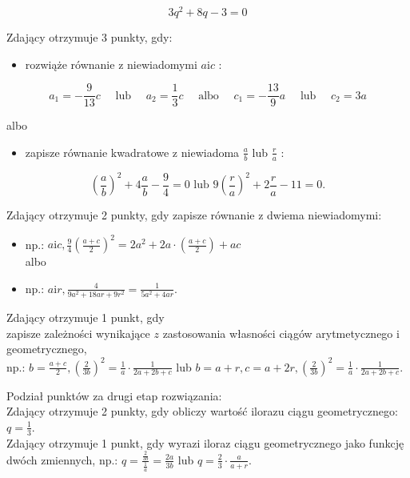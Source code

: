 \documentclass[10pt]{article}
\begin{document}
$$
3 q^{2}+8 q-3=0
$$

Zdający otrzymuje 3 punkty, gdy:

\begin{itemize}
  \item rozwiąże równanie z niewiadomymi $a \mathrm{i} c$ :
\end{itemize}

$$
a_{1}=-\frac{9}{13} c \quad \text { lub } \quad a_{2}=\frac{1}{3} c \quad \text { albo } \quad c_{1}=-\frac{13}{9} a \quad \text { lub } \quad c_{2}=3 a
$$

albo

\begin{itemize}
  \item zapisze równanie kwadratowe z niewiadoma $\frac{a}{b}$ lub $\frac{r}{a}$ :
\end{itemize}

$$
\left(\frac{a}{b}\right)^{2}+4 \frac{a}{b}-\frac{9}{4}=0 \text { lub } 9\left(\frac{r}{a}\right)^{2}+2 \frac{r}{a}-11=0 .
$$

Zdający otrzymuje 2 punkty, gdy zapisze równanie z dwiema niewiadomymi:

\begin{itemize}
  \item np.: $a \mathrm{i} c, \frac{9}{4}\left(\frac{a+c}{2}\right)^{2}=2 a^{2}+2 a \cdot\left(\frac{a+c}{2}\right)+a c$\\
albo
  \item np.: $a \mathrm{i} r, \frac{4}{9 a^{2}+18 a r+9 r^{2}}=\frac{1}{5 a^{2}+4 a r}$.
\end{itemize}

Zdający otrzymuje 1 punkt, gdy\\
zapisze zależności wynikające $z$ zastosowania własności ciągów arytmetycznego i geometrycznego,\\
np.: $b=\frac{a+c}{2},\left(\frac{2}{3 b}\right)^{2}=\frac{1}{a} \cdot \frac{1}{2 a+2 b+c}$ lub $b=a+r, c=a+2 r,\left(\frac{2}{3 b}\right)^{2}=\frac{1}{a} \cdot \frac{1}{2 a+2 b+c}$.

Podział punktów za drugi etap rozwiązania:\\
Zdający otrzymuje 2 punkty, gdy obliczy wartość ilorazu ciągu geometrycznego: $q=\frac{1}{3}$.\\
Zdający otrzymuje 1 punkt, gdy wyrazi iloraz ciągu geometrycznego jako funkcję dwóch zmiennych, np.: $q=\frac{\frac{2}{3 b}}{\frac{1}{a}}=\frac{2 a}{3 b}$ lub $q=\frac{2}{3} \cdot \frac{a}{a+r}$.
\end{document}
